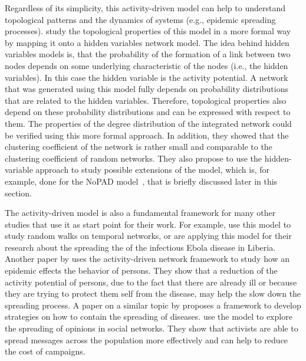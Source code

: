 Regardless of its simplicity, this activity-driven model can help to understand topological patterns and the dynamics of systems (e.g., epidemic spreading processes).
\citet{Starnini2013} study the topological properties of this model in a more formal way by mapping it onto a hidden variables network model.
The idea behind hidden variables models is, that the probability of the formation of a link between two nodes depends on some underlying characteristic of the nodes (i.e., the hidden variables).
In this case the hidden variable is the activity potential.
A network that was generated using this model fully depends on probability distributions that are related to the hidden variables.
Therefore, topological properties also depend on these probability distributions and can be expressed with respect to them.
The properties of the degree distribution of the integrated network could be verified using this more formal approach.
In addition, they showed that the clustering coefficient of the network is rather small and comparable to the clustering coefficient of random networks.
They also propose to use the hidden-variable approach to study possible extensions of the model, which is, for example, done for the NoPAD model~\cite{Moinet2015}, that is briefly discussed later in this section.

The activity-driven model is also a fundamental framework for many other studies that use it as start point for their work.
For example, \citet{Perra2012b} use this model to study random walks on temporal networks, or \citet{Rizzo2016} are applying this model for their research about the spreading the of the infectious Ebola disease in Liberia.
Another paper by \citet{Rizzo2014} uses the activity-driven network framework to study how an epidemic effects the behavior of persons.
They show that a reduction of the activity potential of persons, due to the fact that there are already ill or because they are trying to protect them self from the disease, may help the slow down the spreading process.
A paper on a similar topic by \citet{Liu2014} proposes a framework to develop strategies on how to contain the spreading of diseases.
\citet{Mistry2015} use the model to explore the spreading of opinions in social networks.
They show that activists are able to spread messages across the population more effectively and can help to reduce the cost of campaigns.

